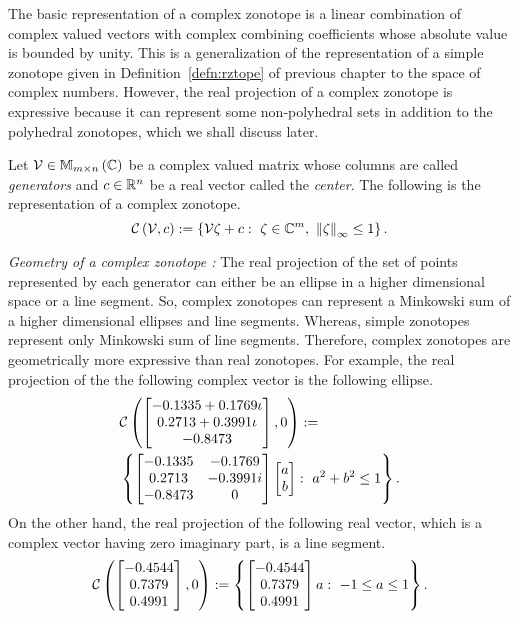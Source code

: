 The basic representation of a complex zonotope is a linear combination
of complex valued vectors with complex combining coefficients whose
absolute value is bounded by unity.  This is a generalization of the
representation of a simple zonotope given in Definition~\ref{defn:rztope} of
previous chapter to the space of complex numbers.  However, the real
projection of a complex zonotope is expressive because it can
represent some non-polyhedral sets in addition to the polyhedral
zonotopes, which we shall discuss later.
%
\begin{definition}
Let $\mathcal{V}\in\mathbb{M}_{m\times n}\left(\mathbb{C}\right)$ be a complex valued matrix
whose columns are called {\it generators} and $c\in\mathbb{R}^n$ be a
real vector called the {\it center}.  The following is the
representation of a
complex zonotope.
%
\begin{equation}
\mathit{\mathcal{C}}\left(\mathcal{V},c\right) := \left\{\mathcal{V}\zeta+c:~\zeta\in\mathbb{C}^m,~\left\|\zeta\right\|_{\infty}\leq 1\right\}.
\end{equation}
%
\end{definition}
%
{\it Geometry of a complex zonotope :} The real projection of the set
of points represented by each generator can either be an ellipse in a
higher dimensional space or a line segment.  So, complex zonotopes can
represent a Minkowski sum of a higher dimensional ellipses and line
segments.  Whereas, simple zonotopes represent only Minkowski sum of
line segments.  Therefore, complex zonotopes are geometrically more
expressive than real zonotopes.  For example, the real projection of
the the following complex vector is the following ellipse.
%
\begin{align*}
& \mathit{\mathcal{C}}\left(\left[\begin{matrix}-0.1335 + 0.1769\iota\\0.2713 + 0.3991\iota\\-0.8473 \end{matrix}\right],0\right):=~~\\
& \left\{{\left[\begin{matrix}-0.1335 &  -0.1769\\0.2713 & -0.3991i\\-0.8473 & 0\end{matrix}\right]}\left[\begin{matrix}a\\b\end{matrix}\right]:~a^2+b^2\leq 1\right\}.
\end{align*}
%
On the other hand, the real projection of the following real vector, which is a
complex vector having zero imaginary part, is a line segment.
%
\begin{align*}
\mathit{\mathcal{C}}\left(\left[\begin{matrix}-0.4544\\
    0.7379\\
    0.4991\end{matrix}\right],0\right):=\left\{\left[\begin{matrix}-0.4544\\
    0.7379\\
    0.4991\end{matrix}\right]a:~-1\leq a\leq 1\right\}.
\end{align*}
